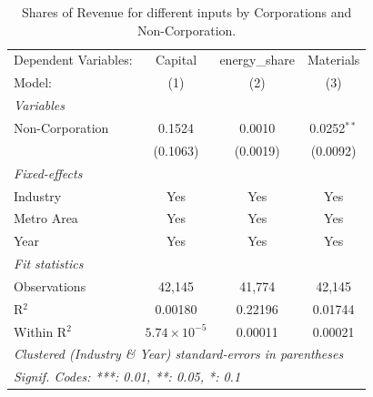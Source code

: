 \documentclass[
  12pt]{article}
\theoremstyle{definition}
\theoremstyle{remark}
\begin{document}
\begin{table}

\caption{\label{tbl-reg-shares}Shares of Revenue for different inputs by
Corporations and Non-Corporation.}

\begin{minipage}{\linewidth}

\begingroup
\centering
\begin{tabular}{lccc}
   \tabularnewline \midrule \midrule
   Dependent Variables: & Capital               & energy\_share  & Materials\\  
   Model:               & (1)                   & (2)            & (3)\\  
   \midrule
   \emph{Variables}\\
   Non-Corporation      & 0.1524                & 0.0010         & 0.0252$^{**}$\\   
                        & (0.1063)              & (0.0019)       & (0.0092)\\   
   \midrule
   \emph{Fixed-effects}\\
   Industry             & Yes                   & Yes            & Yes\\  
   Metro Area           & Yes                   & Yes            & Yes\\  
   Year                 & Yes                   & Yes            & Yes\\  
   \midrule
   \emph{Fit statistics}\\
   Observations         & 42,145                & 41,774         & 42,145\\  
   R$^2$                & 0.00180               & 0.22196        & 0.01744\\  
   Within R$^2$         & $5.74\times 10^{-5}$  & 0.00011        & 0.00021\\  
   \midrule \midrule
   \multicolumn{4}{l}{\emph{Clustered (Industry \& Year) standard-errors in parentheses}}\\
   \multicolumn{4}{l}{\emph{Signif. Codes: ***: 0.01, **: 0.05, *: 0.1}}\\
\end{tabular}
\par\endgroup

\end{minipage}%

\end{table}%
\end{document}
